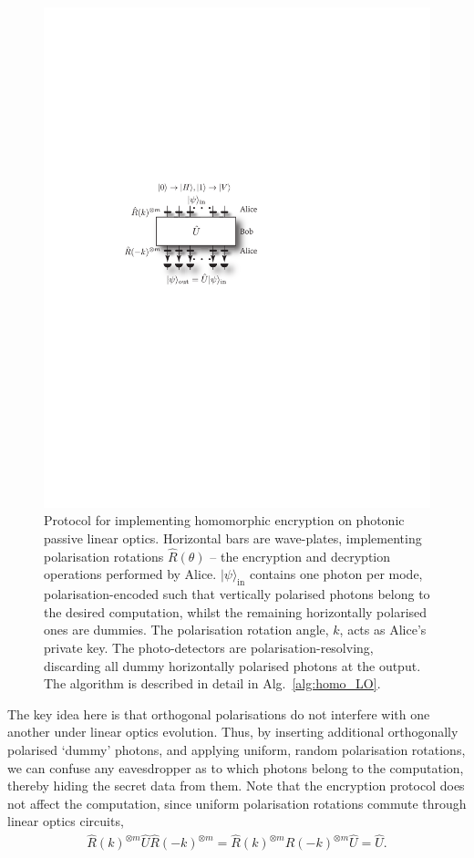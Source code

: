 \documentclass[aps,rmp,twocolumn,amsmath,amssymb,nofootinbib,superscriptaddress,longbibliography,floatfix,table-of-contents,eqsecnum]{revtex4-1}
\newcommand{\ket}[1]{|#1\rangle}
\begin{document}
\begin{figure}[!htb]
\includegraphics[width=0.85\columnwidth]{BS_homo}
\caption{Protocol for implementing homomorphic encryption on photonic passive linear optics. Horizontal bars are wave-plates, implementing polarisation rotations $\hat{R}(\theta)$ -- the encryption and decryption operations performed by Alice. $\ket\psi_\text{in}$ contains one photon per mode, polarisation-encoded such that vertically polarised photons belong to the desired computation, whilst the remaining horizontally polarised ones are dummies. The polarisation rotation angle, $k$, acts as Alice's private key. The photo-detectors are polarisation-resolving, discarding all dummy horizontally polarised photons at the output. The algorithm is described in detail in Alg.~\ref{alg:homo_LO}.} \label{fig:BS_homo}
\end{figure}

The key idea here is that orthogonal polarisations do not interfere with one another under linear optics evolution. Thus, by inserting additional orthogonally polarised `dummy' photons, and applying uniform, random polarisation rotations, we can confuse any eavesdropper as to which photons belong to the computation, thereby hiding the secret data from them. Note that the encryption protocol does not affect the computation, since uniform polarisation rotations commute through linear optics circuits,
\begin{align} \label{eq:LO_key_commute}
\hat{R}(k)^{\otimes m} \hat{U} \hat{R}(-k)^{\otimes m} = \hat{R}(k)^{\otimes m} \hat{R}(-k)^{\otimes m} \hat{U} = \hat{U}.
\end{align}
\end{document}
